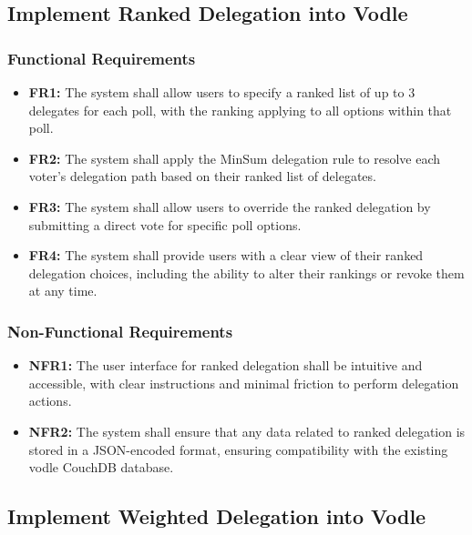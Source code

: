 \subsection{Implement Ranked Delegation into Vodle}\label{subsec:requirements_ranked_delegation}

\subsubsection{Functional Requirements}
\begin{itemize}
    \item \textbf{FR1:} The system shall allow users to specify a ranked list of up to 3 delegates for each poll, with the ranking applying to all options within that poll.
    
    \item \textbf{FR2:} The system shall apply the MinSum delegation rule to resolve each voter's delegation path based on their ranked list of delegates.
    
    \item \textbf{FR3:} The system shall allow users to override the ranked delegation by submitting a direct vote for specific poll options.
    
    \item \textbf{FR4:} The system shall provide users with a clear view of their ranked delegation choices, including the ability to alter their rankings or revoke them at any time.
\end{itemize}

\subsubsection{Non-Functional Requirements}
\begin{itemize}
    \item \textbf{NFR1:} The user interface for ranked delegation shall be intuitive and accessible, with clear instructions and minimal friction to perform delegation actions.
    
    \item \textbf{NFR2:} The system shall ensure that any data related to ranked delegation is stored in a JSON-encoded format, ensuring compatibility with the existing vodle CouchDB database.
\end{itemize}
\subsection{Implement Weighted Delegation into Vodle}\label{subsec:requirements_weighte}
